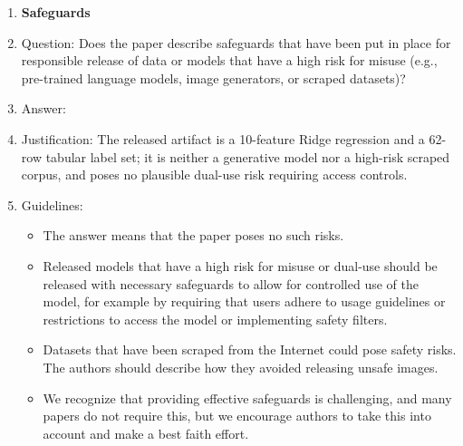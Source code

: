 \documentclass{article}
\begin{document}
\begin{enumerate}
\item {\bf Safeguards}
    \item[] Question: Does the paper describe safeguards that have been put in place for responsible release of data or models that have a high risk for misuse (e.g., pre-trained language models, image generators, or scraped datasets)?
    \item[] Answer: \answerNA{}
    \item[] Justification: The released artifact is a 10-feature Ridge regression and a 62-row tabular label set; it is neither a generative model nor a high-risk scraped corpus, and poses no plausible dual-use risk requiring access controls.
    \item[] Guidelines:
    \begin{itemize}
        \item The answer \answerNA{} means that the paper poses no such risks.
        \item Released models that have a high risk for misuse or dual-use should be released with necessary safeguards to allow for controlled use of the model, for example by requiring that users adhere to usage guidelines or restrictions to access the model or implementing safety filters.
        \item Datasets that have been scraped from the Internet could pose safety risks. The authors should describe how they avoided releasing unsafe images.
        \item We recognize that providing effective safeguards is challenging, and many papers do not require this, but we encourage authors to take this into account and make a best faith effort.
    \end{itemize}


\end{enumerate}
\end{document}
